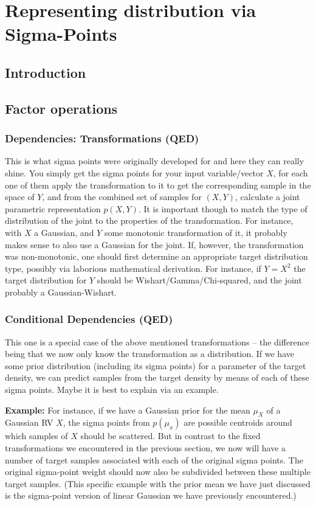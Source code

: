 \chapter{Representing distribution via Sigma-Points}


\section{Introduction}


\section{Factor operations}


\subsection{Dependencies: Transformations (QED)}

This is what sigma points were originally developed for and here they
can really shine. You simply get the sigma points for your input variable/vector
$X$, for each one of them apply the transformation to it to get the
corresponding sample in the space of $Y$, and from the combined set
of samples for $(X,Y)$, calculate a joint parametric representation
$p(X,Y)$. It is important though to match the type of distribution
of the joint to the properties of the transformation. For instance,
with $X$ a Gaussian, and $Y$ some monotonic transformation of it,
it probably makes sense to also use a Gaussian for the joint. If,
however, the transformation was non-monotonic, one should first determine
an appropriate target distribution type, possibly via laborious mathematical
derivation. For instance, if $Y=X^{2}$ the target distribution for
$Y$ should be Wishart/Gamma/Chi-squared, and the joint probably a
Gaussian-Wishart.


\subsection{Conditional Dependencies (QED)}

This one is a special case of the above mentioned transformations
-- the difference being that we now only know the transformation as
a distribution. If we have some prior distribution (including its
sigma points) for a parameter of the target density, we can predict
samples from the target density by means of each of these sigma points.
Maybe it is best to explain via an example.

\textbf{Example:} For instance, if we have a Gaussian prior for the
mean $\mu_{X}$ of a Gaussian RV $X$, the sigma points from $p(\mu_{x})$
are possible centroids around which samples of $X$ should be scattered.
But in contrast to the fixed transformations we encountered in the
previous section, we now will have a number of target samples associated
with each of the original sigma points. The original sigma-point weight
should now also be subdivided between these multiple target samples.
(This specific example with the prior mean we have just discussed
is the sigma-point version of linear Gaussian we have previously encountered.)

